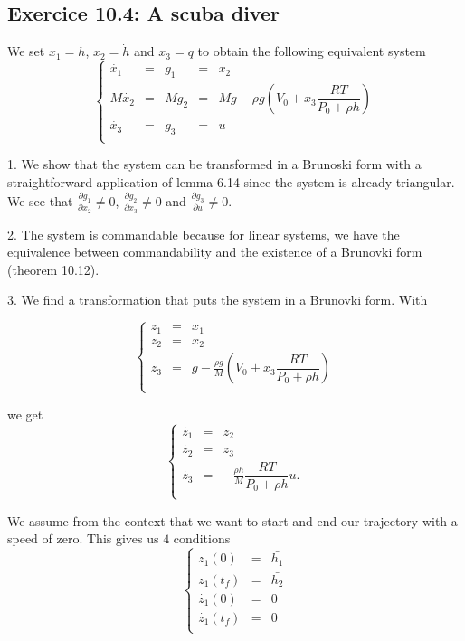 \subsection*{Exercice 10.4: A scuba diver}
We set $x_{1}=h$, $x_{2}=\dot{h}$ and $x_{3}=q$ to obtain the following equivalent system
$$\left\lbrace\begin{array}{ccccl}
\dot{x_{1}} & = & g_{1} & = & x_{2}\\
M\dot{x_{2}} & = & Mg_{2} & = & Mg-\rho g(V_{0}+x_{3}\dfrac{RT}{P_{0}+\rho h})\\
\dot{x_{3}} & = & g_{3} & = & u\\
\end{array}\right.$$


1. We show that the system can be transformed in a Brunoski form with a straightforward application of lemma 6.14 since the system is already triangular. We see that $\frac{\partial g_{1}}{\partial x_{2}}\neq 0$, $\frac{\partial g_{2}}{\partial x_{3}}\neq 0$ and $\frac{\partial g_{3}}{\partial u}\neq 0$.

2. The system is commandable because for linear systems, we have the equivalence between commandability and the existence of a Brunovki form (theorem 10.12).

3. We find a transformation that puts the system in a Brunovki form. With 

$$\left\lbrace\begin{array}{ccl}
z_{1} & = & x_{1}\\
z_{2} & = & x_{2}\\
z_{3} & = & g-\frac{\rho g}{M}(V_{0}+x_{3}\dfrac{RT}{P_{0}+\rho h})\\
\end{array}\right.$$

we get 
$$\left\lbrace\begin{array}{ccl}
\dot{z_{1}} & = & z_{2}\\
\dot{z_{2}} & = & z_{3}\\
\dot{z_{3}} & = & -\frac{\rho h}{M}\dfrac{RT}{P_{0}+\rho h}u.\\
\end{array}\right.$$

We assume from the context that we want to start and end our trajectory with a speed of zero. This gives us $4$ conditions 
$$\left\lbrace\begin{array}{ccl}
z_{1}(0) & = & \bar{h_{1}}\\
z_{1}(t_{f}) & = & \bar{h_{2}}\\
\dot{z_{1}}(0) & = & 0\\
\dot{z_{1}}(t_{f}) & = & 0\\
\end{array}\right.$$

